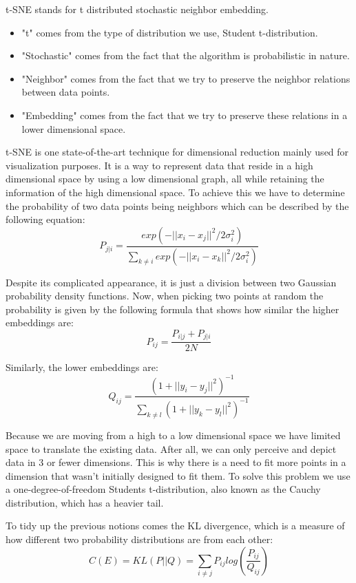 t-SNE stands for t distributed stochastic neighbor embedding. 
\begin{itemize}
    \item "t" comes from the type of distribution we use, Student t-distribution.
    \item "Stochastic" comes from the fact that the algorithm is probabilistic in nature.
    \item "Neighbor" comes from the fact that we try to preserve the neighbor relations between data points.
    \item "Embedding" comes from the fact that we try to preserve these relations in a lower dimensional space.
\end{itemize}
t-SNE is one state-of-the-art technique for dimensional reduction mainly used for visualization purposes. It is a 
way to represent data that reside in a high dimensional space by using a low dimensional graph, all while 
retaining the information of the high dimensional space. To achieve this we have to determine the probability
of two data points being neighbors which can be described by the following equation:
$$P_{j|i} = \frac{exp(-||x_i - x_j||^2 / 2\sigma_i^2)}{\sum_{k \neq i} exp(-||x_i - x_k||^2 / 2\sigma_i^2)}$$

Despite its complicated appearance, it is just a division between two Gaussian probability density functions.
Now, when picking two points at random the probability is given by the following formula that shows how similar
the higher embeddings are:
$$P_{ij} = \frac{P_{i|j} + P_{j|i}}{2N}$$

Similarly, the lower embeddings are: 
$$Q_{ij} = \frac{(1 + ||y_i - y_j||^2)^{-1}}{\sum_{k \neq l} (1 + ||y_k - y_l||^2)^{-1}}$$

Because we are moving from a high to a low dimensional space we have limited space to translate the existing
data. After all, we can only perceive and depict data in 3 or fewer dimensions. This is why there is a need to
fit more points in a dimension that wasn't initially designed to fit them. To solve this problem we use a 
one-degree-of-freedom Students t-distribution, also known as the Cauchy distribution, which has a heavier tail.

To tidy up the previous notions comes the KL divergence, which is a measure of how different two probability
distributions are from each other:
$$C(E) = KL(P||Q) = \sum_{i \neq j} P_{ij} log\left(\frac{P_{ij}}{Q_{ij}}\right)$$

